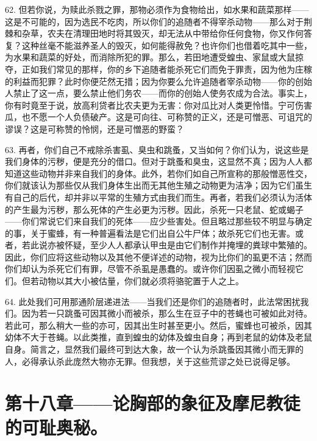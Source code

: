 62. 但若你说，为赎此杀戮之罪，那物必须作为食物给出，如水果和蔬菜那样——这是不可能的，因为选民不吃肉，所以你们的追随者不得宰杀动物——那么对于荆棘和杂草，农夫在清理田地时将其毁灭，却无法从中带给你任何食物，你又作何答复？这种丝毫不能滋养圣人的毁灭，如何能得赦免？也许你们也借着吃其中一些，为水果和蔬菜的好处，而消除所犯的罪。那么，若田地遭受蝗虫、家鼠或大鼠掠夺，正如我们常见的那样，你的乡下追随者能杀死它们而免于罪责，因为他为庄稼的利益而犯罪？此时你便茫然无措；因为你要么允许追随者宰杀动物——你的创始人禁止了这一点，要么禁止他们务农——而你的创始人使务农成为合法。事实上，你有时竟至于说，放高利贷者比农夫更为无害：你对瓜比对人类更怜惜。宁可伤害瓜，也不愿一个人负债破产。这是可向往、可称赞的正义，还是可憎恶、可诅咒的谬误？这是可称赞的怜悯，还是可憎恶的野蛮？\par

63. 再者，你们自己不戒除杀害虱、臭虫和跳蚤，又当如何？你们认为，说这些是我们身体的污秽，便是充分的借口。但对于跳蚤和臭虫，这显然不真；因为人人都知道这些动物并非来自我们的身体。此外，若你们如自己所宣称的那般憎恶性交，你们就该认为那些仅从我们身体生出而无其他生殖之动物更为洁净；因为它们虽生有自己的后代，却并非以平常的生殖方式由我们而生。再者，若我们必须认为活体的产生最为污秽，那么死体的产生必更为污秽。因此，杀死一只老鼠、蛇或蝎子——你们常说它们来自我们的死体——应少些害处。但且略过那些较不明显与确定的事，关于蜜蜂，有一种普遍看法是它们出自公牛尸体；故杀死它们也无害。或者，若此说亦被怀疑，至少人人都承认甲虫是由它们制作并掩埋的粪球中繁殖的。因此，你们应将这些动物以及其他不便详述的动物，视为比你们的虱更不洁；然而你们却认为杀死它们有罪，尽管不杀虱是愚蠢的。或许你们因虱之微小而轻视它们。但若动物以其大小被估量，你们就必须将骆驼置于人之上。\par

64. 此处我们可用那通阶层递进法——当我们还是你们的追随者时，此法常困扰我们。因为若一只跳蚤可因其微小而被杀，那么生在豆子中的苍蝇也可被如此对待。若此可，那么稍大一些的亦可，因其出生时甚至更小。然后，蜜蜂也可被杀，因其幼体不大于苍蝇。以此类推，直到蝗虫的幼体及蝗虫自身；再到老鼠的幼体及老鼠自身。简言之，显然我们最终可到达大象，故一个认为杀跳蚤因其微小而无罪的人，必得承认杀此庞然大物亦无罪。但我想，关于这些荒谬之处已说得足够。\par


\section{第十八章——论胸部的象征及摩尼教徒的可耻奥秘。}


